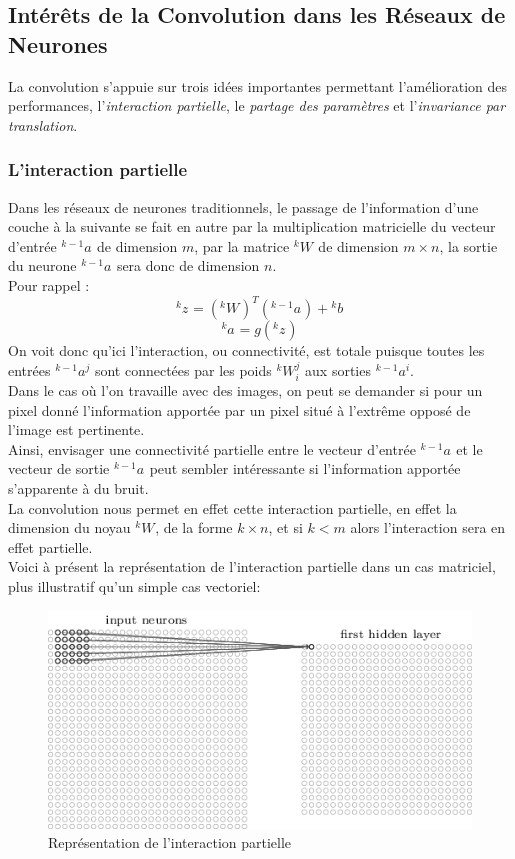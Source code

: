 \documentclass[10pt,a4paper]{report}
\newcommand{\lexp}[1]{\phantom{}^{#1}}
\newcommand{\elem}[4]{\lexp{#2}#1^{#3}_{#4}}
\begin{document}
		\subsection{Intérêts de la Convolution dans les Réseaux de Neurones}
		La convolution s'appuie sur trois idées importantes permettant l'amélioration des performances, l'\emph{interaction partielle}, le \emph{partage des paramètres} et l'\emph{invariance par translation}.
			\subsubsection{L'interaction partielle}
			Dans les réseaux de neurones traditionnels, le passage de l'information d'une couche à la suivante se fait en autre par la multiplication matricielle du vecteur d'entrée $\elem{a}{k-1}{}{}$ de dimension $m$, par la matrice $\elem{W}{k}{}{}$ de dimension $m \times n$, la sortie du neurone $\elem{a}{k-1}{}{}$ sera donc de dimension $n$.\\
			Pour rappel :
			$$\elem{z}{k}{}{} = (\elem{W}{k}{}{})^T(\elem{a}{k-1}{}{}) + \elem{b}{k}{}{}$$
			$$\elem{a}{k}{}{} = g(\elem{z}{k}{}{})$$
			On voit donc qu'ici l'interaction, ou connectivité, est totale puisque toutes les entrées $\elem{a}{k-1}{j}{}$ sont connectées par les poids $\elem{W}{k}{j}{i}$ aux sorties $\elem{a}{k-1}{i}{}$.\\
			Dans le cas où l'on travaille avec des images, on peut se demander si pour un pixel donné l'information apportée par un pixel situé à l'extrême opposé de l'image est pertinente.\\
			Ainsi, envisager une connectivité partielle entre le vecteur d'entrée $\elem{a}{k-1}{}{}$ et le vecteur de sortie $\elem{a}{k-1}{}{}$ peut sembler intéressante si l'information apportée s'apparente à du bruit.\\
			La convolution nous permet en effet cette interaction partielle, en effet la dimension du noyau $\elem{W}{k}{}{}$, de la forme $k \times n$, et si $k < m$ alors l'interaction sera en effet partielle.\\
			Voici à présent la représentation de l'interaction partielle dans un cas matriciel, plus illustratif qu'un simple cas vectoriel:
			\begin{figure}[H]
				\begin{center}
					\includegraphics[scale=0.60]{Images/convolutionlayer.png}
					\caption{Représentation de l'interaction partielle}
				\end{center}
			\end{figure}
			
\end{document}
